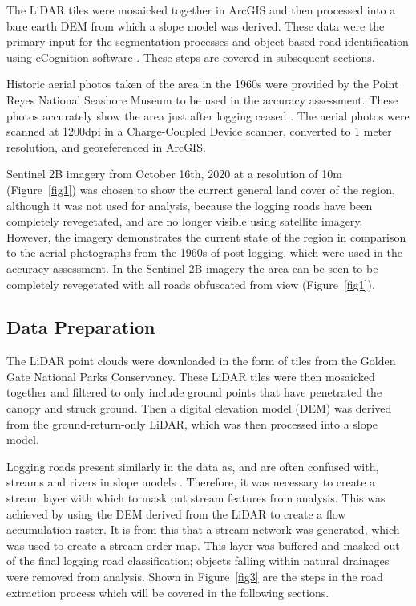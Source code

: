 \documentclass[remotesensing,article,submit,pdftex,moreauthors]{Definitions/mdpi}
\begin{document}
The LiDAR tiles were mosaicked together in ArcGIS \cite{esri} and then processed into a bare earth DEM from which a slope model was derived. These data were the primary input for the segmentation processes and object-based road identification using eCognition software \cite{ecog}. These steps are covered in subsequent sections.

Historic aerial photos taken of the area in the 1960s were provided by the Point Reyes National Seashore Museum to be used in the accuracy assessment. These photos accurately show the area just after logging ceased \cite{becker}. The aerial photos were scanned at 1200dpi in a Charge-Coupled Device scanner, converted to 1 meter resolution, and georeferenced in ArcGIS. 

Sentinel 2B imagery from October 16th, 2020 at a resolution of 10m (Figure~\ref{fig1}) was chosen to show the current general land cover of the region, although it was not used for analysis, because the logging roads have been completely revegetated, and are no longer visible using satellite imagery. However, the imagery demonstrates the current state of the region in comparison to the aerial photographs from the 1960s of post-logging, which were used in the accuracy assessment. In the Sentinel 2B imagery the area can be seen to be completely revegetated with all roads obfuscated from view (Figure~\ref{fig1}). 
\subsection{Data Preparation}

The LiDAR point clouds were downloaded in the form of tiles from the Golden Gate National Parks Conservancy. These LiDAR tiles were then mosaicked together and filtered to only include ground points that have penetrated the canopy and struck ground. Then a digital elevation model (DEM) was derived from the ground-return-only LiDAR, which was then processed into a slope model.

Logging roads present similarly in the data as, and are often confused with, streams and rivers in slope models \cite{sherba}. Therefore, it was necessary to create a stream layer with which to mask out stream features from analysis. This was achieved by using the DEM derived from the LiDAR to create a flow accumulation raster. It is from this that a stream network was generated, which was used to create a stream order map. This layer was buffered and masked out of the final logging road classification; objects falling within natural drainages were removed from analysis. Shown in Figure~\ref{fig3} are the steps in the road extraction process which will be covered in the following sections.
\end{document}
